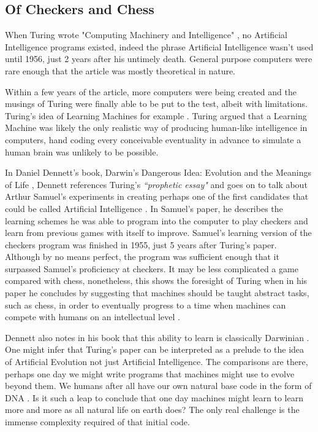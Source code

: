 \documentclass{scrartcl}
\begin{document}
\subsection{Of Checkers and Chess}

When Turing wrote "Computing Machinery and Intelligence" \cite{turing1950computing:1}, no Artificial Intelligence programs existed, indeed the phrase Artificial Intelligence wasn't used until 1956, just 2 years after his untimely death. General purpose computers were rare enough that the article was mostly theoretical in nature. \par
Within a few years of the article, more computers were being created and the musings of Turing were finally able to be put to the test, albeit with limitations. Turing's idea of Learning Machines for example \cite{ramscar2010computing:9}. Turing argued that a Learning Machine was likely the only realistic way of producing human-like intelligence in computers, hand coding every conceivable eventuality in advance to simulate a human brain was unlikely to be possible. 

In Daniel Dennett's book, Darwin's Dangerous Idea: Evolution and the Meanings of Life \cite[p.207-212]{dennett1996darwin:10}, Dennett references Turing's \textit{\textquotedblleft prophetic essay"} and goes on to talk about Arthur Samuel's experiments in creating perhaps one of the first candidates that could be called Artificial Intelligence \cite{samuel2000some:11}. In Samuel's paper, he describes the learning schemes he was able to program into the computer to play checkers and learn from previous games with itself to improve. Samuel's learning version of the checkers program was finished in 1955, just 5 years after Turing's paper. Although by no means perfect, the program was sufficient enough that it surpassed Samuel's proficiency at checkers. It may be less complicated a game compared with chess, nonetheless, this shows the foresight of Turing when in his paper he concludes by suggesting that machines should be taught abstract tasks, such as chess, in order to eventually progress to a time when machines can compete with humans on an intellectual level \cite[p.26-30]{dawkins2016selfish:12}. 

Dennett also notes in his book that this ability to learn is classically Darwinian \cite{darwin2009origin:13}. One might infer that Turing's paper can be interpreted as a prelude to the idea of Artificial Evolution not just Artificial Intelligence. The comparisons are there, perhaps one day we might write programs that machines might use to evolve beyond them. We humans after all have our own natural base code in the form of DNA \cite[p.66-68]{dawkins2016selfish:12}. Is it such a leap to conclude that one day machines might learn to learn more and more as all natural life on earth does? The only real challenge is the immense complexity required of that initial code.
\end{document}
